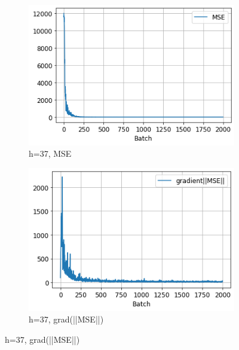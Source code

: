 \documentclass{homework}
\begin{document}
\begin{figure}[H]
\medskip
\begin{subfigure}{0.4\textwidth}
\includegraphics[width=\linewidth]{h37_MSE.png}
\caption{h=37, MSE} \label{fig:e}
\end{subfigure}\hspace*{\fill}
\begin{subfigure}{0.4\textwidth}
\includegraphics[width=\linewidth]{h37_gradient.png}
\caption{h=37, grad(||MSE||)} \label{fig:f}
\end{subfigure}


\end{figure}
\end{document}
